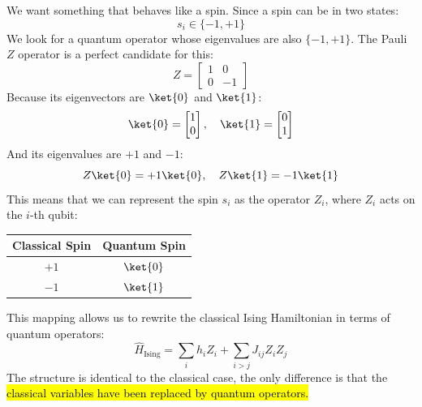 \highspace
We want something that behaves like a spin. Since a spin can be in two states:
\begin{equation*}
    s_i \in \{-1, +1\}
\end{equation*}
We look for a quantum operator whose eigenvalues are also $\{-1, +1\}$. The Pauli $Z$ operator is a perfect candidate for this:
\begin{equation*}
    Z = \begin{bmatrix}
        1 & 0 \\
        0 & -1
    \end{bmatrix}
\end{equation*}
Because its eigenvectors are $\ket{0}$ and $\ket{1}$:
\begin{equation*}
    \ket{0} = \begin{bmatrix}
        1 \\
        0
    \end{bmatrix}, \quad \ket{1} = \begin{bmatrix}
        0 \\
        1
    \end{bmatrix}
\end{equation*}
And its eigenvalues are $+1$ and $-1$:
\begin{equation*}
    Z \ket{0} = +1 \ket{0}, \quad Z \ket{1} = -1 \ket{1}
\end{equation*}
This means that we can represent the spin $s_i$ as the operator $Z_i$, where $Z_i$ acts on the $i$-th qubit:
\begin{center}
    \begin{tabular}{@{} c c @{}}
        \toprule
        \textbf{Classical Spin} & \textbf{Quantum Spin} \\
        \midrule
        $+1$ & $\ket{0}$ \\
        $-1$ & $\ket{1}$ \\
        \bottomrule
    \end{tabular}
\end{center}

\noindent
This mapping allows us to rewrite the classical Ising Hamiltonian in terms of quantum operators:
\begin{equation}\label{eq:quantum-ising-hamiltonian}
    \hat{H}_{\text{Ising}} = \sum_i h_i Z_i + \sum_{i > j} J_{ij} Z_i Z_j
\end{equation}
The structure is identical to the classical case, the only difference is that the \hl{classical variables have been replaced by quantum operators.}